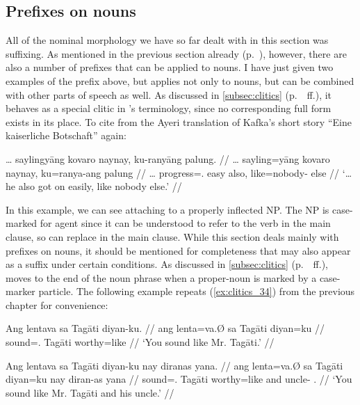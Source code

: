 
\subsection{Prefixes on nouns}
\label{subsec:nounpref}

All of the nominal morphology we have so far dealt with in this section was
suffixing. As mentioned in the previous section already
(p.~\pageref{nounprefixes}), however, there are also a number of prefixes that
can be applied to nouns. I have just given two examples of the prefix
 above, but  applies not only
to nouns, but can be combined with other parts of speech as well. As discussed
in \autoref{subsec:clitics} (p.~\pageref{clitics_prenoun_ku}~ff.), it behaves as a
special clitic in \citet{zwicky1977}'s terminology, since no
corresponding full form exists in its place. To cite from the Ayeri
translation of Kafka's short story \enquote{Eine kaiserliche Botschaft} again:

\ex\label{ex:kukafka2}\begingl
	\gla … saylingyāng kovaro naynay, ku-ranyāng palung. //
	\glb … sayling=yāng kovaro naynay, ku=ranya-ang palung //
	\glc … progress=\TsgM{}.\Aarg{} easy also, like=nobody-\Aarg{} else //
	\glft `… he also got on easily, like nobody else.'%
	//
\endgl\xe

In this example, we can see  attaching to a properly inflected
NP. The NP  is case-marked for agent since it can be
understood to refer to the verb  in the main
clause, so  can replace
 in the main clause. While this section deals mainly
with prefixes on nouns, it should be mentioned for completeness that
 may also appear as a suffix under certain conditions. As
discussed in \autoref{subsec:clitics} (p.~\pageref{clitics_prenoun_ku}~ff.),
 moves to the end of the noun phrase when a proper-noun is
marked by a case-marker particle. The following example repeats
(\ref{ex:clitics_34}) from the previous chapter for convenience:

\pex
\a\begingl
	\gla Ang lentava sa Tagāti diyan-ku. //
	\glb ang lenta=va.Ø sa Tagāti diyan=ku //
	\glc \AgtT{} sound=\Second{}.\Top{} \Parg{} Tagāti worthy=like //
	\glft `You sound like Mr. Tagāti.' //
\endgl

\a\begingl
	\gla Ang lentava sa Tagāti diyan-ku nay diranas yana. //
	\glb ang lenta=va.Ø sa Tagāti diyan=ku nay diran-as yana //
	\glc \AgtT{} sound=\Second{}.\Top{} \Parg{} Tagāti worthy=like and 
		uncle-\Parg{} \TsgM{}.\Gen{} //
	\glft `You sound like Mr. Tagāti and his uncle.' //
\endgl

